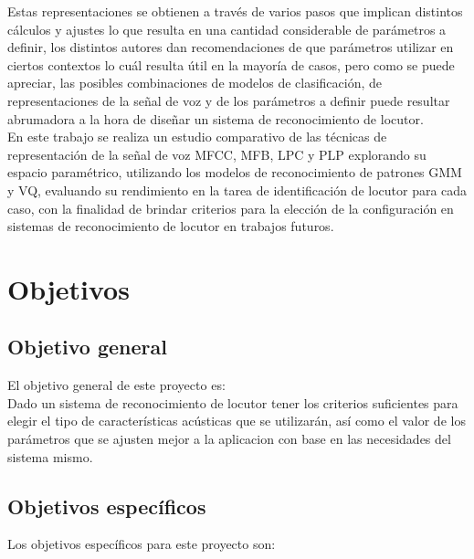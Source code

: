 Estas representaciones se obtienen a trav\'es de varios pasos que implican distintos c\'alculos y ajustes lo que resulta en una cantidad considerable de par\'ametros a definir, los distintos autores dan recomendaciones de que par\'ametros utilizar en ciertos contextos lo cu\'al resulta \'util en la mayor\'ia de casos, pero como se puede apreciar, las posibles combinaciones de modelos de clasificaci\'on, de representaciones de la señal de voz y de los par\'ametros a definir puede resultar abrumadora a la hora de diseñar un sistema de reconocimiento de locutor.\\ 

En este trabajo se realiza un estudio comparativo de las t\'ecnicas de representaci\'on de la señal de voz MFCC, MFB, LPC y PLP explorando su espacio param\'etrico, utilizando los modelos de reconocimiento de patrones GMM y VQ, evaluando su rendimiento en la tarea de identificaci\'on de locutor para cada caso, con la finalidad de brindar criterios para la elecci\'on de la configuraci\'on en sistemas de reconocimiento de locutor en trabajos futuros.\\




\medskip

\section{Objetivos} \label{sect:objetivos}

\subsection{Objetivo general} \label{subsec:objetivo_general}

El objetivo general de este proyecto es:\\

Dado un sistema de reconocimiento de locutor tener los criterios suficientes para elegir el tipo de caracterí­sticas acústicas que se utilizarán, así­ como el valor de los parámetros que se ajusten mejor a la aplicacion con base en las necesidades del sistema mismo. 
\medskip

\subsection{Objetivos específicos} \label{subsec:objetivos_especificos}

Los objetivos específicos para este proyecto son:\\


